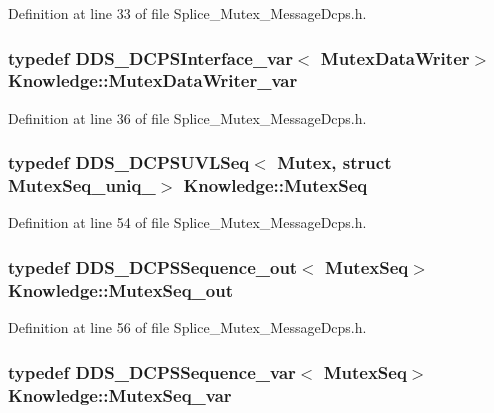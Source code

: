 Definition at line 33 of file Splice\_\-Mutex\_\-MessageDcps.h.

\hypertarget{namespaceKnowledge_a6883244ee070735ab1d7ad34821094fd}{
\subsubsection[{MutexDataWriter\_\-var}]{\setlength{\rightskip}{0pt plus 5cm}typedef DDS\_\-DCPSInterface\_\-var$<$ {\bf MutexDataWriter}$>$ {\bf Knowledge::MutexDataWriter\_\-var}}}
\label{da/d50/namespaceKnowledge_a6883244ee070735ab1d7ad34821094fd}


Definition at line 36 of file Splice\_\-Mutex\_\-MessageDcps.h.

\hypertarget{namespaceKnowledge_a3165529aa87299c6a92754fbd7eeeff4}{
\subsubsection[{MutexSeq}]{\setlength{\rightskip}{0pt plus 5cm}typedef DDS\_\-DCPSUVLSeq$<$ {\bf Mutex}, struct {\bf MutexSeq\_\-uniq\_\-}$>$ {\bf Knowledge::MutexSeq}}}
\label{da/d50/namespaceKnowledge_a3165529aa87299c6a92754fbd7eeeff4}


Definition at line 54 of file Splice\_\-Mutex\_\-MessageDcps.h.

\hypertarget{namespaceKnowledge_a2cb18227e83b174622e0f73179f97620}{
\subsubsection[{MutexSeq\_\-out}]{\setlength{\rightskip}{0pt plus 5cm}typedef DDS\_\-DCPSSequence\_\-out$<$ {\bf MutexSeq}$>$ {\bf Knowledge::MutexSeq\_\-out}}}
\label{da/d50/namespaceKnowledge_a2cb18227e83b174622e0f73179f97620}


Definition at line 56 of file Splice\_\-Mutex\_\-MessageDcps.h.

\hypertarget{namespaceKnowledge_a8d0cc4b24b6fed706c73d5a321910fa8}{
\subsubsection[{MutexSeq\_\-var}]{\setlength{\rightskip}{0pt plus 5cm}typedef DDS\_\-DCPSSequence\_\-var$<$ {\bf MutexSeq}$>$ {\bf Knowledge::MutexSeq\_\-var}}}
\label{da/d50/namespaceKnowledge_a8d0cc4b24b6fed706c73d5a321910fa8}


